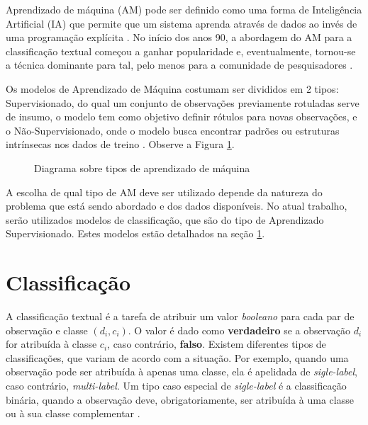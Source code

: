Aprendizado de máquina (AM) pode ser definido como uma forma de Inteligência Artificial (IA) que permite que um sistema aprenda através de dados ao invés de uma programação explícita \cite{mlfordummyes:2018}. No início dos anos 90, a abordagem do AM para a classificação textual começou a ganhar popularidade e, eventualmente, tornou-se a técnica dominante para tal, pelo menos para a comunidade de pesquisadores \cite{Sebastiani_2002}.

Os modelos de Aprendizado de Máquina costumam ser divididos em 2 tipos: Supervisionado, do qual um conjunto de observações previamente rotuladas serve de insumo, o modelo tem como objetivo definir rótulos para novas observações, e o Não-Supervisionado, onde o modelo busca encontrar padrões ou estruturas intrínsecas nos dados de treino \cite{mwmachinelearning}. Observe a Figura \ref{fig:ml_types}.

\begin{figure}[!htb]
    \caption{Diagrama sobre tipos de aprendizado de máquina}
    \label{fig:ml_types}
\end{figure}

A escolha de qual tipo de AM deve ser utilizado depende da natureza do problema que está sendo abordado e dos dados disponíveis. No atual trabalho, serão utilizados modelos de classificação, que são do tipo de Aprendizado Supervisionado. Estes modelos estão detalhados na seção \ref{Classificação}.


\section{Classificação}
\label{Classificação}

A classificação textual é a tarefa de atribuir um valor \textit{booleano} para cada par de observação e classe $(d_i, c_i)$. O valor é dado como \textbf{verdadeiro} se a observação $d_i$ for atribuída à classe $c_i$, caso contrário, \textbf{falso}. Existem diferentes tipos de classificações, que variam de acordo com a situação. Por exemplo, quando uma observação pode ser atribuída à apenas uma classe, ela é apelidada de \textit{sigle-label}, caso contrário, \textit{multi-label}. Um tipo caso especial de \textit{sigle-label} é a classificação binária, quando a observação deve, obrigatoriamente, ser atribuída à uma classe ou à sua classe complementar \cite{Sebastiani_2002}.

